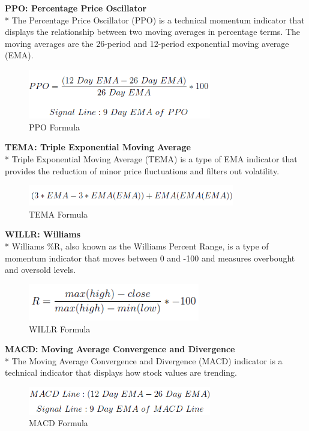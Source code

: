 \documentclass{article}
\begin{document}
\noindent
\textbf{PPO: Percentage Price Oscillator} \\*
The Percentage Price Oscillator (PPO) is a technical momentum indicator that displays the relationship between two moving averages in percentage terms. The moving averages are the 26-period and 12-period exponential moving average (EMA).
\begin{figure}[H]
\begin{center}
   \includegraphics[width=80mm,scale=0.8]{assets/formulas/ppo.png}
   \caption{PPO Formula}
\end{center}
\end{figure}
\noindent
\textbf{TEMA: Triple Exponential Moving Average} \\*
Triple Exponential Moving Average (TEMA) is a type of EMA indicator that provides the reduction of minor price fluctuations and filters out volatility.
\begin{figure}[H]
\begin{center}
   \includegraphics[width=90mm,scale=0.8]{assets/formulas/tema.png}
   \caption{TEMA Formula}
\end{center}
\end{figure}
\noindent
\textbf{WILLR: Williams} \\*
Williams \%R, also known as the Williams Percent Range, is a type of momentum indicator that moves between 0 and -100 and measures overbought and oversold levels.
\begin{figure}[H]
\begin{center}
    \includegraphics[width=75mm,scale=0.8]{assets/formulas/willr.png}
    \caption{WILLR Formula}
\end{center}
\end{figure}
\noindent
\textbf{MACD: Moving Average Convergence and Divergence} \\*
The Moving Average Convergence and Divergence (MACD) indicator is a technical indicator that displays how stock values are trending.
\begin{figure}[H]
\begin{center}
    \includegraphics[width=80mm,scale=0.8]{assets/formulas/macd.png}
    \caption{MACD Formula}
\end{center}
\end{figure}
\noindent
\end{document}
